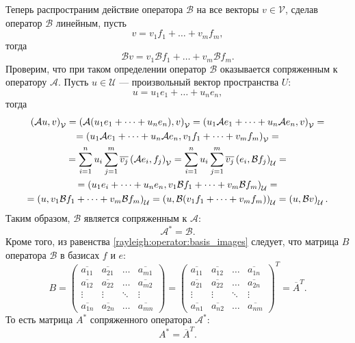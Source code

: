 Теперь распространим действие оператора $\mathcal{B}$ на все векторы $v \in \mathcal{V}$, сделав оператор $\mathcal{B}$ линейным, пусть
\[
    v = v_1 f_1 + \dots + v_m f_m,
\]
тогда
\[
    \mathcal{B} v = v_1 \mathcal{B} f_1 + \dots + v_m \mathcal{B} f_m .
\]
Проверим, что при таком определении оператор $\mathcal{B}$ оказывается сопряженным к оператору $\mathcal{A}$. Пусть $u \in \mathcal{U}$ --- произвольный вектор
пространства $U$:
\[
    u = u_1 e_1 + \dots + u_n e_n,
\]
тогда
\begin{multline*}
    \left ( \mathcal{A} u, v \right )_\mathcal{V}
    = \left ( \mathcal{A} (u_1 e_1 + \dots + u_n e_n), v \right )_\mathcal{V}
    = \left ( u_1 \mathcal{A} e_1 + \dots + u_n \mathcal{A} e_n, v \right )_\mathcal{V} = \\
    = \left ( u_1 \mathcal{A} e_1 + \dots + u_n \mathcal{A} e_n, v_1 f_1 + \dots + v_m f_m \right )_\mathcal{V} = \\
    = \sum_{i=1}^n u_i \sum_{j=1}^m \overline{v_j} \left ( \mathcal{A} e_i, f_j \right )_\mathcal{V}
    = \sum_{i=1}^n u_i \sum_{j=1}^m \overline{v_j} \left ( e_i, \mathcal{B} f_j \right )_\mathcal{U} = \\
    = \left ( u_1 e_i + \dots + u_n e_n, v_1 \mathcal{B} f_1 + \dots + v_m \mathcal{B} f_m \right )_\mathcal{U} = \\
    = \left ( u, v_1 \mathcal{B} f_1 + \dots + v_m \mathcal{B} f_m \right )_\mathcal{U}
    = \left ( u, \mathcal{B} (v_1 f_1 + \dots + v_m f_m) \right )_\mathcal{U}
    = \left ( u, \mathcal{B} v \right )_\mathcal{U} .
\end{multline*}
Таким образом, $\mathcal{B}$ является сопряженным к $\mathcal{A}$:
\[
    \mathcal{A}^* = \mathcal{B}.
\]
Кроме того, из равенства \eqref{rayleigh:operator:basis_images} следует, что матрица $B$ оператора $\mathcal{B}$ в базисах $f$ и $e$:
\[
    B =
    \begin{pmatrix}
        \overline{a_{11}} & \overline{a_{21}} & \dots  & \overline{a_{m1}} \\
        \overline{a_{12}} & \overline{a_{22}} & \dots  & \overline{a_{m2}} \\
        \vdots            & \vdots            & \ddots & \vdots            \\
        \overline{a_{1n}} & \overline{a_{2n}} & \dots  & \overline{a_{mn}}
    \end{pmatrix}
    =
    \begin{pmatrix}
        \overline{a_{11}} & \overline{a_{12}} & \dots  & \overline{a_{1n}} \\
        \overline{a_{21}} & \overline{a_{22}} & \dots  & \overline{a_{2n}} \\
        \vdots            & \vdots            & \ddots & \vdots            \\
        \overline{a_{n1}} & \overline{a_{n2}} & \dots  & \overline{a_{nm}}
    \end{pmatrix}^T
    = \overline{A}^T .
\]
То есть матрица $A^*$ сопряженного оператора $\mathcal{A}^*$:
\[
    A^* = \overline{A}^T .
\]


